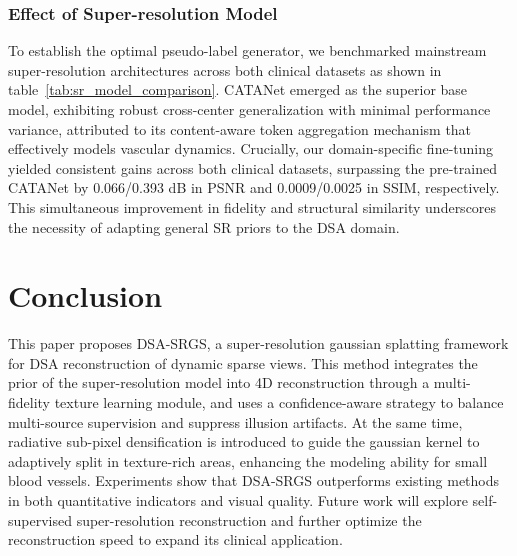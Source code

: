 \documentclass[runningheads]{llncs}
\begin{document}

\subsubsection{Effect of Super-resolution Model} To establish the optimal pseudo-label generator, we benchmarked mainstream super-resolution architectures across both clinical datasets as shown in table~\ref{tab:sr_model_comparison}. 
%
CATANet emerged as the superior base model, exhibiting robust cross-center generalization with minimal performance variance, attributed to its content-aware token aggregation mechanism that effectively models vascular dynamics. 
%
Crucially, our domain-specific fine-tuning yielded consistent gains across both clinical datasets, surpassing the pre-trained CATANet by 0.066/0.393 dB in PSNR and 0.0009/0.0025 in SSIM, respectively. This simultaneous improvement in fidelity and structural similarity underscores the necessity of adapting general SR priors to the DSA domain. 

\section{Conclusion} %
This paper proposes DSA-SRGS, a super-resolution gaussian splatting framework for DSA reconstruction of dynamic sparse views. This method integrates the prior of the super-resolution model into 4D reconstruction through a multi-fidelity texture learning module, and uses a confidence-aware strategy to balance multi-source supervision and suppress illusion artifacts. At the same time, radiative sub-pixel densification is introduced to guide the gaussian kernel to adaptively split in texture-rich areas, enhancing the modeling ability for small blood vessels. Experiments show that DSA-SRGS outperforms existing methods in both quantitative indicators and visual quality. Future work will explore self-supervised super-resolution reconstruction and further optimize the reconstruction speed to expand its clinical application.
\end{document}
